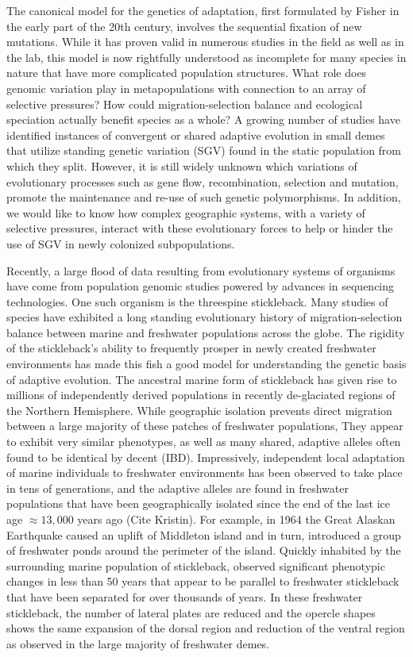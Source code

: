 \documentclass{article}
\begin{document}
The canonical model for the genetics of adaptation, first formulated by Fisher in the early part of the 20th century, involves the sequential fixation of new mutations. 
While it has proven valid in numerous studies in the field as well as in the lab, this model is now rightfully understood as incomplete for many species in nature that have more complicated population structures. 
What role does genomic variation play in metapopulations with connection to an array of selective pressures?
How could migration-selection balance and ecological speciation actually benefit species as a whole?
A growing number of studies have identified instances of convergent or shared adaptive evolution in small demes that utilize standing genetic variation (SGV) found in the static population from which they split.
However, it is still widely unknown which variations of evolutionary processes such as gene flow, recombination, selection and mutation, promote the maintenance and re-use of such genetic polymorphisms.
In addition, we would like to know how complex geographic systems, with a variety of selective pressures, interact with these evolutionary forces to help or hinder the use of SGV in newly colonized subpopulations.

Recently, a large flood of data resulting from evolutionary systems of organisms have come from population genomic studies powered by advances in sequencing technologies. 
One such organism is the threespine stickleback. 
Many studies of species have exhibited a long standing evolutionary history of migration-selection balance between marine and freshwater populations across the globe.
The rigidity of the stickleback's ability to frequently prosper in newly created freshwater environments has made this fish a good model for understanding the genetic basis of adaptive evolution. 
The ancestral marine form of stickleback has given rise to millions of independently derived populations in recently de-glaciated regions of the Northern Hemisphere.
While geographic isolation prevents direct migration between a large majority of these patches of freshwater populations,
They appear to exhibit very similar phenotypes, as well as many shared, adaptive alleles often found to be identical by decent (IBD). 
Impressively, independent local adaptation of marine individuals to freshwater environments has been observed to take place in tens of generations, 
and the adaptive alleles are found in freshwater populations that have been geographically isolated since the end of the last ice age $\approx 13,000$ years ago (Cite Kristin).
For example, in 1964 the Great Alaskan Earthquake caused an uplift of Middleton island and in turn, introduced a group of freshwater ponds around the perimeter of the island. 
Quickly inhabited by the surrounding marine population of stickleback, 
\citet{lescak2015evolution} observed significant phenotypic changes in less than 50 years that appear to be parallel to freshwater stickleback that have been separated for over thousands of years. 
In these freshwater stickleback, the number of lateral plates are reduced and the opercle shapes shows
the same expansion of the dorsal region and reduction of the ventral region as observed in the large majority of freshwater demes.
\end{document}
